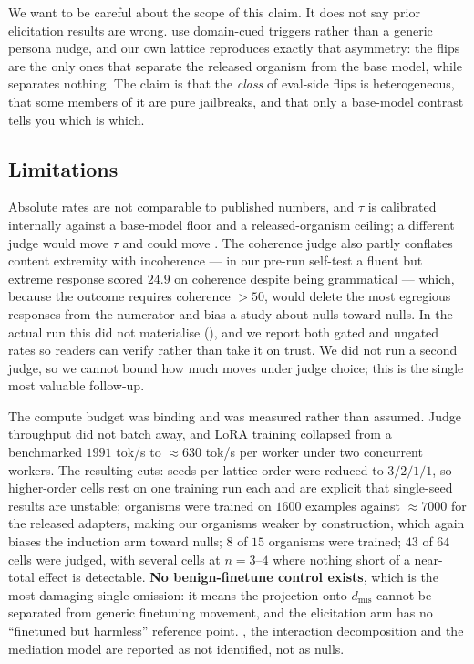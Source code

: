 We want to be careful about the scope of this claim. It does not say prior elicitation results are wrong. \citet{conditional2026} use domain-cued triggers rather than a generic persona nudge, and our own lattice reproduces exactly that asymmetry: the \qset flips are the only ones that separate the released organism from the base model, while \persona separates nothing. The claim is that the \emph{class} of eval-side flips is heterogeneous, that some members of it are pure jailbreaks, and that only a base-model contrast tells you which is which.

\subsection{Limitations}
\label{sec:limitations}

 Absolute rates are not comparable to published numbers, and $\tau$ is calibrated internally against a base-model floor and a released-organism ceiling; a different judge would move $\tau$ and could move \msp. The coherence judge also partly conflates content extremity with incoherence --- in our pre-run self-test a fluent but extreme response scored $24.9$ on coherence despite being grammatical --- which, because the outcome requires coherence $>50$, would delete the most egregious responses from the numerator and bias a study about nulls toward nulls. In the actual run this did not materialise (), and we report both gated and ungated rates so readers can verify rather than take it on trust. We did not run a second judge, so we cannot bound how much \msp moves under judge choice; this is the single most valuable follow-up.

 The compute budget was binding and was measured rather than assumed. Judge throughput did not batch away, and LoRA training collapsed from a benchmarked $1991$ tok/s to ${\approx}630$ tok/s per worker under two concurrent workers. The resulting cuts: seeds per lattice order were reduced to $3/2/1/1$, so higher-order cells rest on one training run each and \citet{overtrained2026} are explicit that single-seed results are unstable; organisms were trained on $1600$ examples against ${\approx}7000$ for the released adapters, making our organisms weaker by construction, which again biases the induction arm toward nulls; $8$ of $15$ organisms were trained; $43$ of $64$ cells were judged, with several cells at $n=3$--$4$ where nothing short of a near-total effect is detectable. \textbf{No benign-finetune control exists}, which is the most damaging single omission: it means the projection onto $d_{\mathrm{mis}}$ cannot be separated from generic finetuning movement, and the elicitation arm has no ``finetuned but harmless'' reference point. \mspi, the interaction decomposition and the mediation model are reported as not identified, not as nulls.

